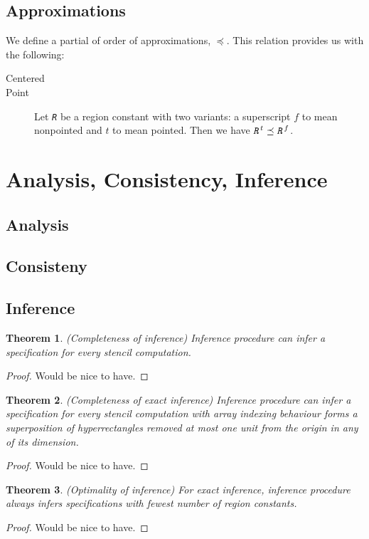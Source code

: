 \documentclass{article}
\theoremstyle{definition}
\theoremstyle{plain}
\newtheorem{thm}{Theorem}
\newcommand{\textcap}[1]{\texttt{\textit{#1}}}
\begin{document}
\subsection{Approximations}
We define a partial of order of approximations, $\preceq$. This relation
provides us with the following:

\begin{description}
  \item[Centered]
  \item[Point] Let \textcap{R} be a region constant with two variants: a
    superscript $f$ to mean nonpointed and $t$ to mean pointed. Then we have
    $\textcap{R}^t \preceq \textcap{R}^f$.
\end{description}

\section{Analysis, Consistency, Inference}

\subsection{Analysis}

\subsection{Consisteny}

\subsection{Inference}

\begin{thm}{(Completeness of inference)}
  Inference procedure can infer a specification for every stencil computation.
\end{thm}
%
\begin{proof}
  Would be nice to have.
\end{proof}

\begin{thm}{(Completeness of exact inference)}
  Inference procedure can infer a specification for every stencil computation
  with array indexing behaviour forms a superposition of hyperrectangles removed
  at most one unit from the origin in any of its dimension.
\end{thm}
%
\begin{proof}
  Would be nice to have.
\end{proof}

\begin{thm}{(Optimality of inference)}
  For exact inference, inference procedure always infers specifications with
  fewest number of region constants.
\end{thm}
%
\begin{proof}
  Would be nice to have.
\end{proof}
\end{document}

